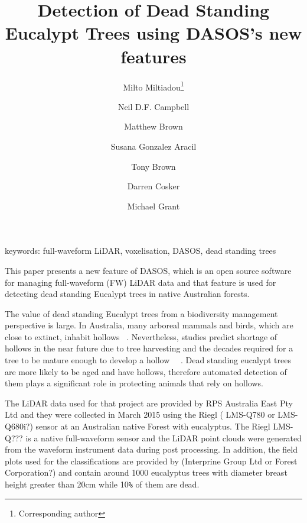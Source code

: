 \documentclass{article}
\begin{document}
	\title{\textbf{Detection of Dead Standing Eucalypt Trees using DASOS's new features}}
	\date{\vspace{-5ex}}
	\author [1,2,3]{Milto Miltiadou\thanks{Corresponding author}}
	\author [1]{Neil D.F. Campbell}
	\author [1]{Matthew Brown}
	\author [3]{Susana Gonzalez Aracil}
	\author [4]{Tony Brown}
	\author [1]{Darren Cosker}
	\author [2]{ Michael Grant}
	
	\renewcommand\Authands{and}
	\renewcommand{\floatpagefraction}{1}%


 \maketitle
  
\thispagestyle{empty}


keywords: full-waveform LiDAR, voxelisation, DASOS, dead standing trees


This paper presents a new feature of DASOS, which is an open source software for managing full-waveform (FW) LiDAR data and that feature is used for detecting dead standing Eucalypt trees in native Australian forests.

The value of dead standing Eucalypt trees from a biodiversity management perspective is large. In Australia, many arboreal mammals and birds, which are close to extinct, inhabit hollows ~\cite{Gibbons2002}. Nevertheless, studies predict shortage of hollows in the near future due to tree harvesting and the decades required for a tree to be mature enough to develop a hollow ~\cite{Lindenmayer2010}~\cite{Goldingay2009}. Dead standing eucalypt trees are more likely to be aged and have hollows, therefore automated detection of them plays a significant role in protecting animals that rely on hollows. 

The LiDAR data used for that project are provided by RPS Australia East Pty Ltd and they were collected in March 2015 using the Riegl ( LMS-Q780 or LMS-Q680i?) sensor at an Australian native Forest with eucalyptus. The Riegl LMS-Q??? is a native full-waveform sensor and the LiDAR point clouds were generated from the waveform instrument data during post processing. In addition, the field plots used for the classifications are provided by (Interprine Group Ltd or Forest Corporation?) and contain around 1000 eucalyptus trees with diameter breast height greater than 20cm while 10\verb|%| of them are dead. 
\end{document}
